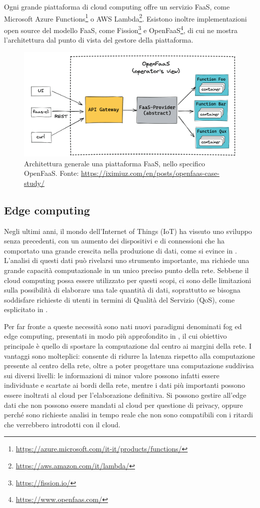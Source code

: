 Ogni grande piattaforma di cloud computing offre un servizio FaaS, come Microsoft Azure Functions\footnote{\url{https://azure.microsoft.com/it-it/products/functions/}} o AWS Lambda\footnote{\url{https://aws.amazon.com/it/lambda/}}. Esistono inoltre implementazioni open source del modello FaaS, come Fission\footnote{\url{https://fission.io/}} e OpenFaaS\footnote{\url{https://www.openfaas.com/}}, di cui  ne mostra l'architettura dal punto di vista del gestore della piattaforma.

\begin{figure}
    \centering
    \includegraphics[width=0.8\linewidth]{assets/2/openfaas.png}
    \caption[Architettura generale di una piattaforma FaaS]{Architettura generale una piattaforma FaaS, nello specifico OpenFaaS. Fonte: \url{https://iximiuz.com/en/posts/openfaas-case-study/}}
    \label{fig:2_openfaas}
\end{figure}

\subsection{Edge computing}

Negli ultimi anni, il mondo dell'Internet of Things (IoT) ha vissuto uno sviluppo senza precedenti, con un aumento dei dispositivi e di connessioni che ha comportato una grande crescita nella produzione di dati, come si evince in \cite{Duarte2024}. L'analisi di questi dati può rivelarsi uno strumento importante, ma richiede una grande capacità computazionale in un unico preciso punto della rete. Sebbene il cloud computing possa essere utilizzato per questi scopi, ci sono delle limitazioni sulla possibilità di elaborare una tale quantità di dati, soprattutto se bisogna soddisfare richieste di utenti in termini di Qualità del Servizio (QoS), come esplicitato in \cite{Laroui2021}.

Per far fronte a queste necessità sono nati nuovi paradigmi denominati fog ed edge computing, presentati in modo più approfondito in \cite{Hurbungs2021}, il cui obiettivo principale è quello di spostare la computazione dal centro ai margini della rete. I vantaggi sono molteplici: consente di ridurre la latenza rispetto alla computazione presente al centro della rete, oltre a poter progettare una computazione suddivisa sui diversi livelli: le informazioni di minor valore possono infatti essere individuate e scartate ai bordi della rete, mentre i dati più importanti possono essere inoltrati al cloud per l’elaborazione definitiva. Si possono gestire all'edge dati che non possono essere mandati al cloud per questione di privacy, oppure perché sono richieste analisi in tempo reale che non sono compatibili con i ritardi che verrebbero introdotti con il cloud.

